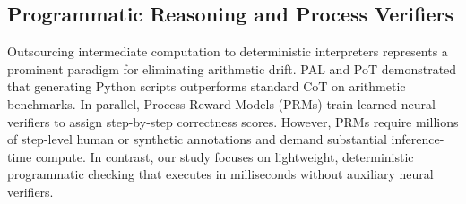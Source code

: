 \documentclass[11pt,a4paper]{article}
\begin{document}
\subsection{Programmatic Reasoning and Process Verifiers}
Outsourcing intermediate computation to deterministic interpreters represents a prominent paradigm for eliminating arithmetic drift. PAL \citep{gao2023pal} and PoT \citep{chen2023program} demonstrated that generating Python scripts outperforms standard CoT on arithmetic benchmarks. In parallel, Process Reward Models (PRMs) \citep{lightman2023let, uesato2022solving} train learned neural verifiers to assign step-by-step correctness scores. However, PRMs require millions of step-level human or synthetic annotations and demand substantial inference-time compute. In contrast, our study focuses on lightweight, deterministic programmatic checking that executes in milliseconds without auxiliary neural verifiers.
\end{document}
